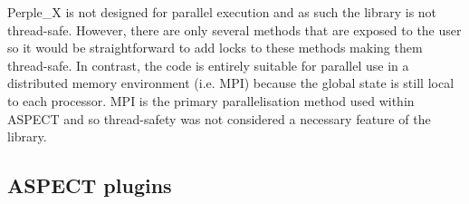 Perple\_X is not designed for parallel execution and as such the library is not thread-safe. 
However, there are only several methods that are exposed to the user so it would be straightforward to add locks to these methods making them thread-safe.
In contrast, the code is entirely suitable for parallel use in a distributed memory environment (i.e. MPI) because the global state is still local to each processor.
MPI is the primary parallelisation method used within ASPECT and so thread-safety was not considered a necessary feature of the library.

\subsection{ASPECT plugins}